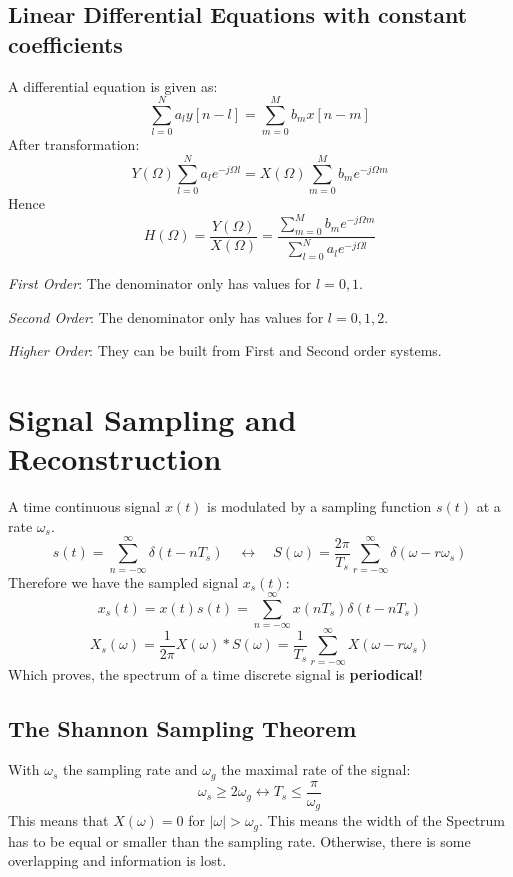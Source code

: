 \documentclass[10pt,a4paper]{article}
\begin{document}
\subsection{Linear Differential Equations with constant coefficients}
A differential equation is given as:
$$
\sum_{l=0}^{N} a_l y[n-l] = \sum_{m=0}^{M} b_m x[n-m]
$$
After transformation:
$$
Y(\Omega) \sum_{l=0}^{N} a_l e^{-j \Omega l} = 
X(\Omega) \sum_{m=0}^{M} b_m e^{-j \Omega m}
$$
Hence
$$
H(\Omega) = \frac{Y(\Omega)}{X(\Omega)} = \frac{\sum_{m=0}^{M} b_m e^{-j \Omega m}}{\sum_{l=0}^{N} a_l e^{-j \Omega l}}
$$

\begin{list}{-}{}
\item \textit{First Order}: The denominator only has values for $l = 0,1$.
\item \textit{Second Order}: The denominator only has values for $l = 0,1,2$.
\item \textit{Higher Order}: They can be built from First and Second order systems. 
\end{list}


\section{Signal Sampling and Reconstruction}
A time continuous signal $x(t)$ is modulated by a sampling function $s(t)$ at a rate $\omega_s$. 
$$
s(t) = \sum_{n=-\infty}^{\infty} \delta(t-nT_s) \quad \leftrightarrow \quad 
S(\omega) = \frac{2\pi}{T_s} \sum_{r=-\infty}^{\infty} \delta(\omega - r \omega_s)
$$
Therefore we have the sampled signal $x_s(t)$:
$$
x_s(t) = x(t)s(t) = \sum_{n=-\infty}^{\infty} x(nT_s)\delta(t - nT_s)
$$
$$
\boxed{
X_s(\omega) = \frac{1}{2\pi} X(\omega)*S(\omega)
			= \frac{1}{T_s} \sum_{r=-\infty}^{\infty} X(\omega - r\omega_s)}
$$
Which proves, the spectrum of a time discrete signal is \textbf{periodical}! 

\subsection{The Shannon Sampling Theorem}
With $\omega_s$ the sampling rate and $\omega_g$ the maximal rate of the signal:
$$
\boxed{
\omega_s \geq 2\omega_g \longleftrightarrow T_s \leq \frac{\pi}{\omega_g}
}
$$
This means that $X(\omega) = 0$ for $\vert\omega\vert > \omega_g$. This means the width of the Spectrum has to be equal or smaller than the sampling rate. Otherwise, there is some overlapping and information is lost. 
\end{document}
